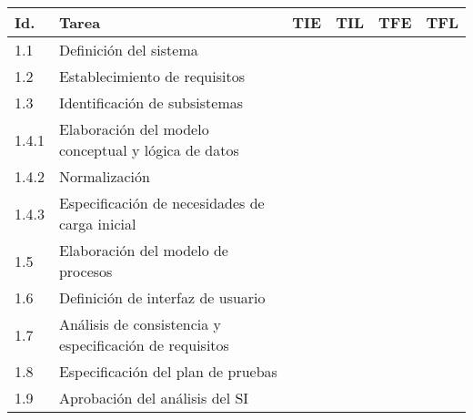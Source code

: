 \documentclass[11pt,a4paper,spanish,twoside]{report}
\begin{document}
\begin{table}[!h]
\centering
   \begin{tabular}{|p{0.8cm}||p{5cm}||p{1.5cm}|p{1.5cm}|p{1.5cm}|p{1.5cm}|}
     \hline
     \textbf{Id.} & \textbf{Tarea} & \textbf{TIE} & \textbf{TIL} &
     \textbf{TFE} & \textbf{TFL}\\
     \hline
      1.1 & Definición del sistema  &  &  &  &  \\
      \hline
      1.2 & Establecimiento de requisitos  &  &  &  &  \\
      \hline
      1.3 & Identificación de subsistemas  &  &  &  &  \\
      \hline
      1.4.1 & Elaboración del modelo conceptual y lógica de datos &  &  &  &  \\
      \hline
      1.4.2 & Normalización  &  &  &  &  \\
      \hline
      1.4.3 & Especificación de necesidades de carga inicial  &  &  &  &  \\
      \hline
      1.5 & Elaboración del modelo de procesos  &  &  &  &  \\
      \hline
      1.6 & Definición de interfaz de usuario  &  &  &  &  \\
      \hline
      1.7 & Análisis de consistencia y especificación de requisitos & & & &\\
      \hline
      1.8 & Especificación del plan de pruebas &  &  &  &\\
      \hline
      1.9 & Aprobación del análisis del SI &  &  &  &  \\
      \hline \hline


\end{tabular}
\end{table}
\end{document}

